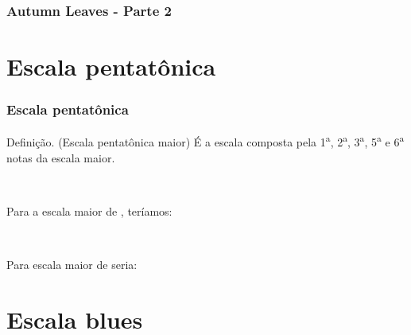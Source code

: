 \documentclass[usenames,dvipsnames]{beamer}
\newcommand\numa[1]{#1\textsuperscript{a}}
\begin{document}
\begin{frame}
  \frametitle{Autumn Leaves - Parte 2}

\end{frame}

\section{Escala pentatônica}

\begin{frame}[fragile]
  \frametitle{Escala pentatônica}

  \begin{block}{Definição. (Escala pentatônica maior)}
    É a escala composta pela \numa{1}, \numa{2}, \numa{3}, \numa{5} e \numa{6} notas da escala maior.
  \end{block}~\\
  \pause

  Para a escala maior de , teríamos:\\

  \begin{center}
  \end{center}~\\
  \pause

  Para escala maior de  seria:\\

  \begin{center}
  \end{center}
\end{frame}

\section{Escala blues}
\end{document}

